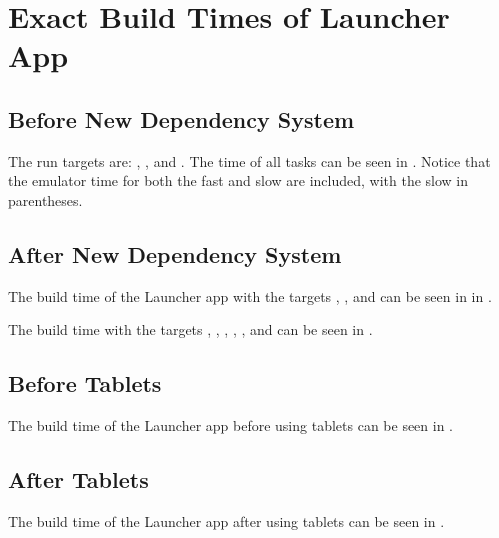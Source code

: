 \chapter{Exact Build Times of Launcher App}
\label{app:build_times}

\section{Before New Dependency System}
The run targets are: , , and . The time of all tasks can be seen in . Notice that the emulator time for both the fast and slow are included, with the slow in parentheses.



\section{After New Dependency System}
The build time of the Launcher app with the targets , , and  can be seen in in .

The build time with the targets , , , , , and  can be seen in .





\section{Before Tablets}
The build time of the Launcher app before using tablets can be seen in .



\section{After Tablets}
The build time of the Launcher app after using tablets can be seen in .



